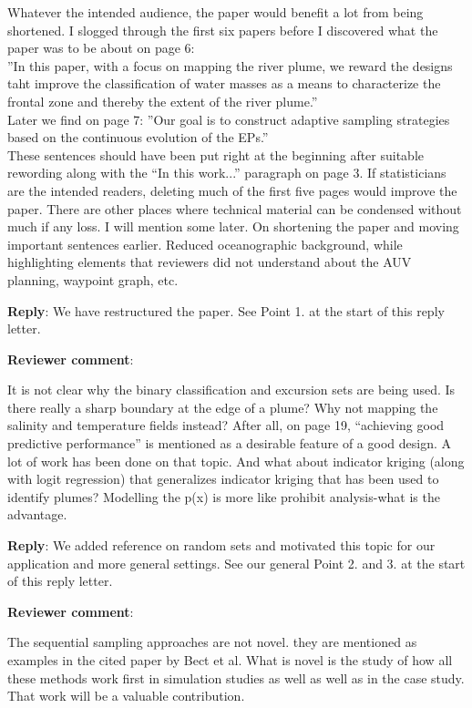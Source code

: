\documentclass[a4paper]{article}
\newcounter{reviewer}
\def\revcom{\textbf{Reviewer comment}}
\def\reply{\textbf{Reply}}
\begin{document}
\begin{answers}
Whatever the intended audience, the paper would benefit a lot from being shortened. I slogged through the first six papers before I discovered what the paper was to be about on page 6:\\
”In this paper, with a focus on mapping the river plume, we reward the designs taht improve the classification of water masses as a means to characterize the frontal zone and thereby the extent of the river plume.”\\
Later we find on page 7:
”Our goal is to construct adaptive sampling strategies based on the continuous evolution of the EPs.”\\
These sentences should have been put right at the beginning after suitable rewording along with the “In this work...” paragraph on page 3. If statisticians are the intended readers, deleting much of the first five pages would improve the paper. There are other places where technical material can be condensed without much if any loss. I will mention some later.
On shortening the paper and moving important sentences earlier. Reduced oceanographic background, while highlighting elements that reviewers did not understand about the AUV planning, waypoint graph, etc.

\reply: We have restructured the paper. See Point 1. at the start of this reply letter. 

\item{\revcom :}\label{r1c6}

It is not clear why the binary classification and excursion sets are being used. Is there really a sharp boundary at the edge of a plume? Why not mapping the salinity and temperature fields instead? After all, on page 19, “achieving good predictive performance” is mentioned as a desirable feature of a good design. A lot of work has been done on that topic. And what about indicator kriging (along with logit regression) that generalizes indicator kriging that has been used to identify plumes? Modelling the p(x) is more like prohibit analysis-what is the advantage.

\reply: We added reference \cite{Molchanov2005} on random sets and motivated this topic for our application and more general settings. See our general Point 2. and 3. at the start of this reply letter. 

\item{\revcom :}\label{r1c7}

 The sequential sampling approaches are not novel. they are mentioned as examples in the cited paper by Bect et al. What is novel is the study of how all these methods work first in simulation studies as well as well as in the case study. That work will be a valuable contribution.


\end{answers}
\end{document}
